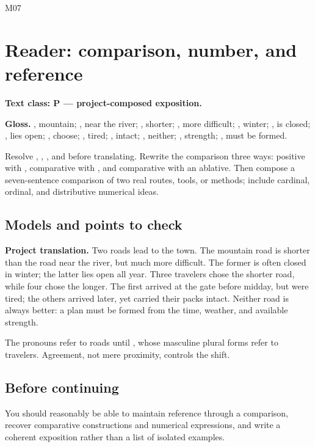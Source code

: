 \begin{courseunit}{M07}
\chapter{Reader: comparison, number, and reference}

\textbf{Text class: P --- project-composed exposition.}


\textbf{Gloss.} , mountain; , near the
river; , shorter; , more difficult;
, winter; , is closed; , lies open;
, choose; , tired; , intact;
, neither; , strength; , must
be formed.

Resolve , , , and  before
translating.  Rewrite the comparison three ways: positive with , comparative with , and comparative with an ablative.
Then compose a seven-sentence comparison of two real routes, tools, or methods;
include cardinal, ordinal, and distributive numerical ideas.

\ifsolutions
\section{Models and points to check}
\textbf{Project translation.} Two roads lead to the town. The mountain road is
shorter than the road near the river, but much more difficult. The former is
often closed in winter; the latter lies open all year. Three travelers chose
the shorter road, while four chose the longer. The first arrived at the gate
before midday, but were tired; the others arrived later, yet carried their
packs intact. Neither road is always better: a plan must be formed from the
time, weather, and available strength.

The pronouns refer to roads until , whose masculine plural
forms refer to travelers.  Agreement, not mere proximity, controls the shift.
\else
\section{Before continuing}
You should reasonably be able to maintain reference through a comparison,
recover comparative constructions and numerical expressions, and write a
coherent exposition rather than a list of isolated examples.
\fi
\end{courseunit}

